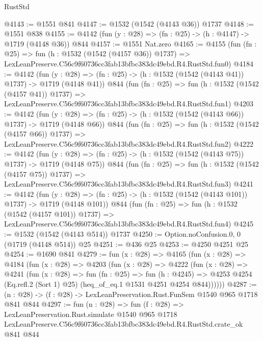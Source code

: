 \begin{lexlean}{RustStd}
\begin{coremodule}
@4143 := @1551 @841
@4147 := @1532 (@1542 (@4143 @36)) @1737
@4148 := @1551 @838
@4155 := @4142 (fun (y : @28) => (fn : @25) -> (h : @4147) -> @1719 (@4148 @36)) @844
@4157 := @1551 Nat.zero
@4165 := @4155
    (fun (fn : @25) =>
    fun (h : @1532 (@1542 (@4157 @36)) @1737) =>
    LexLeanPreserve.C56c9f60736cc3fab13bfbc383dc49ebd.R4.RustStd.fun0)
@4184 := @4142
    (fun (y : @28) => (fn : @25) -> (h : @1532 (@1542 (@4143 @41)) @1737) -> @1719 (@4148 @41))
    @844
    (fun (fn : @25) =>
    fun (h : @1532 (@1542 (@4157 @41)) @1737) =>
    LexLeanPreserve.C56c9f60736cc3fab13bfbc383dc49ebd.R4.RustStd.fun1)
@4203 := @4142
    (fun (y : @28) => (fn : @25) -> (h : @1532 (@1542 (@4143 @66)) @1737) -> @1719 (@4148 @66))
    @844
    (fun (fn : @25) =>
    fun (h : @1532 (@1542 (@4157 @66)) @1737) =>
    LexLeanPreserve.C56c9f60736cc3fab13bfbc383dc49ebd.R4.RustStd.fun2)
@4222 := @4142
    (fun (y : @28) => (fn : @25) -> (h : @1532 (@1542 (@4143 @75)) @1737) -> @1719 (@4148 @75))
    @844
    (fun (fn : @25) =>
    fun (h : @1532 (@1542 (@4157 @75)) @1737) =>
    LexLeanPreserve.C56c9f60736cc3fab13bfbc383dc49ebd.R4.RustStd.fun3)
@4241 := @4142
    (fun (y : @28) => (fn : @25) -> (h : @1532 (@1542 (@4143 @101)) @1737) -> @1719 (@4148 @101))
    @844
    (fun (fn : @25) =>
    fun (h : @1532 (@1542 (@4157 @101)) @1737) =>
    LexLeanPreserve.C56c9f60736cc3fab13bfbc383dc49ebd.R4.RustStd.fun4)
@4245 := @1532 (@1542 (@4143 @514)) @1737
@4250 := Option.noConfusion.{0, 0} (@1719 (@4148 @514)) @25
@4251 := @436 @25
@4253 := @4250 @4251 @25
@4254 := @1690 @841
@4279 := fun (x : @28) =>
  @4165
    (fun (x : @28) =>
    @4184
      (fun (x : @28) =>
      @4203
        (fun (x : @28) =>
        @4222
          (fun (x : @28) =>
          @4241
            (fun (x : @28) =>
            fun (fn : @25) =>
            fun (h : @4245) =>
            @4253 @4254 (Eq.refl.{2} (Sort 1) @25) (heq_of_eq.{1} @1531 @4251 @4254 @844))))))
@4287 := (n : @28) -> (f : @28) -> LexLeanPreservation.Rust.FunSem @1540 @965 @1718 @841 @844
@4297 := fun (n : @28) =>
  fun (f : @28) =>
  LexLeanPreservation.Rust.simulate
    @1540
    @965
    @1718
    LexLeanPreserve.C56c9f60736cc3fab13bfbc383dc49ebd.R4.RustStd.crate_ok
    @841
    @844
\end{coremodule}
\end{lexlean}
